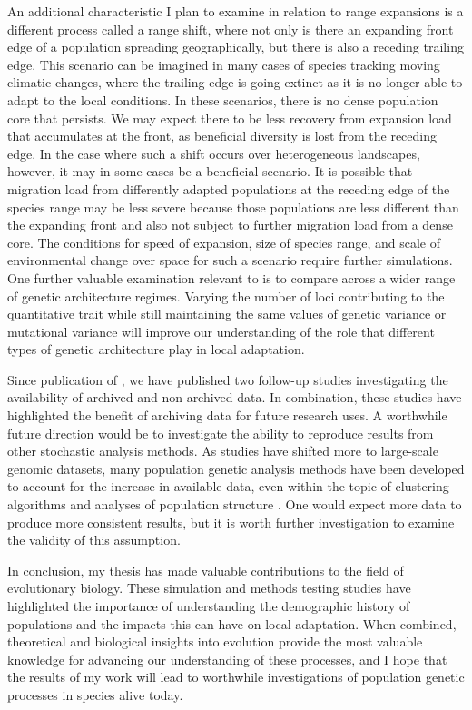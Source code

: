 An additional characteristic I plan to examine in relation to range expansions is a different process called a range shift, where not only is there an expanding front edge of a population spreading geographically, but there is also a receding trailing edge. This scenario can be imagined in many cases of species tracking moving climatic changes, where the trailing edge is going extinct as it is no longer able to adapt to the local conditions. In these scenarios, there is no dense population core that persists. We may expect there to be less recovery from expansion load that accumulates at the front, as beneficial diversity is lost from the receding edge. In the case where such a shift occurs over heterogeneous landscapes, however, it may in some cases be a beneficial scenario. It is possible that migration load from differently adapted populations at the receding edge of the species range may be less severe because those populations are less different than the expanding front and also not subject to further migration load from a dense core. The conditions for speed of expansion, size of species range, and scale of environmental change over space for such a scenario require further simulations. One further valuable examination relevant to  is to compare across a wider range of genetic architecture regimes. Varying the number of loci contributing to the quantitative trait while still maintaining the same values of genetic variance or mutational variance will improve our understanding of the role that different types of genetic architecture play in local adaptation.

Since publication of , we have published two follow-up studies investigating the availability of archived \citep{Vines:2013} and non-archived \citep{Vines:2014} data. In combination, these studies have highlighted the benefit of archiving data for future research uses. A worthwhile future direction would be to investigate the ability to reproduce results from other stochastic analysis methods. As studies have shifted more to large-scale genomic datasets, many population genetic analysis methods have been developed to account for the increase in available data, even within the topic of clustering algorithms and analyses of population structure \citep{Raj:2014, Petkova:2015, Bradburd:2016}. One would expect more data to produce more consistent results, but it is worth further investigation to examine the validity of this assumption.

In conclusion, my thesis has made valuable contributions to the field of evolutionary biology. These simulation and methods testing studies have highlighted the importance of understanding the demographic history of populations and the impacts this can have on local adaptation. When combined, theoretical and biological insights into evolution provide the most valuable knowledge for advancing our understanding of these processes, and I hope that the results of my work will lead to worthwhile investigations of population genetic processes in species alive today.

